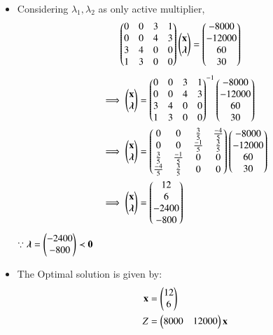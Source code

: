 \documentclass[journal,12pt,twocolumn]{IEEEtran}
\begin{document}
\begin{itemize}
\begin{align}
\end{align}
\item Considering $\lambda_1,\lambda_2$ as only active multiplier,
\begin{align}
    \begin{pmatrix}0 & 0 & 3 & 1  \\ 0 & 0 & 4 & 3 \\ 3 & 4 & 0 & 0 \\1 & 3 & 0 & 0\end{pmatrix}\begin{pmatrix}\mathbf{x}\\ \boldsymbol{\lambda}\end{pmatrix} &= \begin{pmatrix}-8000 \\ -12000 \\ 60 \\ 30\end{pmatrix}
\end{align}
\begin{align}
 \implies   \begin{pmatrix}\mathbf{x} \\ \boldsymbol{\lambda}\end{pmatrix} &=  \begin{pmatrix}0 & 0 & 3 & 1  \\ 0 & 0 & 4 & 3 \\ 3 & 4 & 0 & 0 \\1 & 3 & 0 & 0\end{pmatrix} ^{-1}\begin{pmatrix}-8000 \\ -12000 \\ 60 \\ 30\end{pmatrix}
    \\
    \implies   \begin{pmatrix}\mathbf{x} \\ \boldsymbol{\lambda}\end{pmatrix} &= \begin{pmatrix}0 & 0 & \frac{3}{5} & \frac{-4}{5} \\ 0 & 0 & \frac{-1}{5} & \frac{3}{5} \\ \frac{3}{5} & \frac{-1}{5} & 0 & 0 \\ \frac{-4}{5} & \frac{3}{5} & 0 & 0\end{pmatrix}\begin{pmatrix}-8000 \\ -12000 \\ 60 \\ 30\end{pmatrix}
    \\
    \implies \begin{pmatrix}\mathbf{x} \\ \boldsymbol{\lambda}\end{pmatrix} &= \begin{pmatrix}12 \\6 \\ -2400 \\ -800 \end{pmatrix}
\end{align}
$\because \boldsymbol{\lambda}=\begin{pmatrix}-2400 \\ -800\end{pmatrix} \prec \mathbf{0}$
\\
\item The Optimal solution is given by:
\begin{align}
    \vec{x} &= \myvec{12\\6} \\
    Z &= \myvec{8000&12000}\vec{x} \\

\end{align}
\end{itemize}
\end{document}
